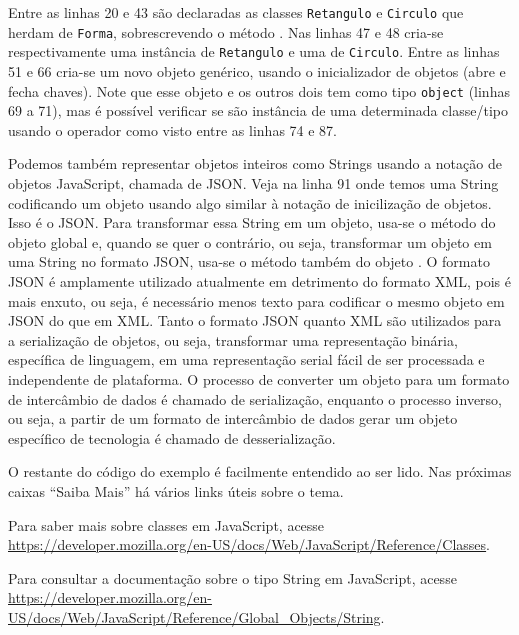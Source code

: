 Entre as linhas 20 e 43 são declaradas as classes \texttt{Retangulo} e \texttt{Circulo} que herdam de \texttt{Forma}, sobrescrevendo o método . Nas linhas 47 e 48 cria-se respectivamente uma instância de \texttt{Retangulo} e uma de \texttt{Circulo}. Entre as linhas 51 e 66 cria-se um novo objeto genérico, usando o inicializador de objetos (abre e fecha chaves). Note que esse objeto e os outros dois tem como tipo \texttt{object} (linhas 69 a 71), mas é possível verificar se são instância de uma determinada classe/tipo usando o operador  como visto entre as linhas 74 e 87.

Podemos também representar objetos inteiros como Strings usando a notação de objetos JavaScript, chamada de JSON. Veja na linha 91 onde temos uma String codificando um objeto usando algo similar à notação de inicilização de objetos. Isso é o JSON. Para transformar essa String em um objeto, usa-se o método  do objeto global  e, quando se quer o contrário, ou seja, transformar um objeto em uma String no formato JSON, usa-se o método  também do objeto . O formato JSON é amplamente utilizado atualmente em detrimento do formato XML, pois é mais enxuto, ou seja, é necessário menos texto para codificar o mesmo objeto em JSON do que em XML. Tanto o formato JSON quanto XML são utilizados para a serialização de objetos, ou seja, transformar uma representação binária, específica de linguagem, em uma representação serial fácil de ser processada e independente de plataforma. O processo de converter um objeto para um formato de intercâmbio de dados é chamado de serialização, enquanto o processo inverso, ou seja, a partir de um formato de intercâmbio de dados gerar um objeto específico de tecnologia é chamado de desserialização.

O restante do código do exemplo é facilmente entendido ao ser lido. Nas próximas caixas ``Saiba Mais'' há vários links úteis sobre o tema.

\begin{saibaMais}
    Para saber mais sobre classes em JavaScript, acesse \url{https://developer.mozilla.org/en-US/docs/Web/JavaScript/Reference/Classes}.
\end{saibaMais}

\begin{saibaMais}
    Para consultar a documentação sobre o tipo String em JavaScript, acesse \url{https://developer.mozilla.org/en-US/docs/Web/JavaScript/Reference/Global_Objects/String}.
\end{saibaMais}


